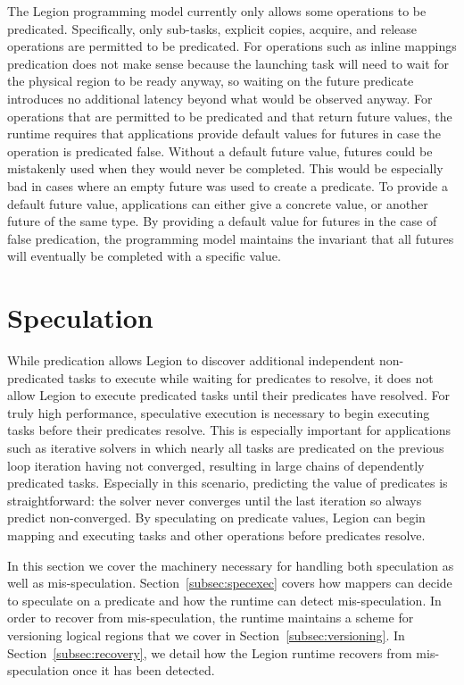 The Legion programming model currently only allows
some operations to be predicated. Specifically, only
sub-tasks, explicit copies, acquire, and release
operations are permitted to be predicated. For 
operations such as inline mappings predication
does not make sense because the launching task will
need to wait for the physical region to be ready
anyway, so waiting on the future predicate introduces
no additional latency beyond what would be observed
anyway. For operations that are permitted to be 
predicated and that return future values, the 
runtime requires that applications provide default
values for futures in case the operation is predicated
false. Without a default future value, futures could
be mistakenly used when they would never be completed.
This would be especially bad in cases where an empty
future was used to create a predicate. To provide a
default future value, applications can either give
a concrete value, or another future of the same
type. By providing a default value for futures in 
the case of false predication, the programming model
maintains the invariant that all futures will eventually
be completed with a specific value.

\section{Speculation}
\label{sec:speculation}
While predication allows Legion to discover additional
independent non-predicated tasks to execute while waiting
for predicates to resolve, it does not allow Legion to
execute predicated tasks until their predicates have
resolved. For truly high performance, speculative execution
is necessary to begin executing tasks before their 
predicates resolve. This is especially important for
applications such as iterative solvers in which nearly
all tasks are predicated on the previous loop iteration
having not converged, resulting in large chains of 
dependently predicated tasks. Especially in this scenario,
predicting the value of predicates is straightforward:
the solver never converges until the last iteration
so always predict non-converged. By speculating on 
predicate values, Legion can begin mapping and executing
tasks and other operations before predicates resolve.

In this section we cover the machinery necessary for 
handling both speculation as well as mis-speculation. 
Section~\ref{subsec:specexec} covers how mappers can
decide to speculate on a predicate and how the runtime
can detect mis-speculation. In order to recover from 
mis-speculation, the runtime maintains a scheme for 
versioning logical regions that we cover in
Section~\ref{subsec:versioning}. In 
Section~\ref{subsec:recovery}, we detail how the Legion
runtime recovers from mis-speculation once it has been
detected.

